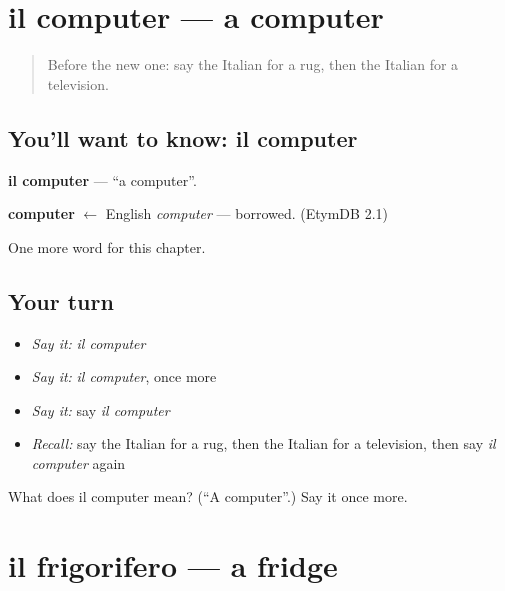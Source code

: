 \section[il computer]{il computer — a computer}

\label{lesson:IT-C94-computer}



\begin{quote}
Before the new one: say the Italian for a rug, then the Italian for a television.
\end{quote}

\subsection*{You'll want to know: il computer}
\textbf{il computer} — \textquotedblleft{}a computer\textquotedblright{}.

\begin{cousinweb}
\textbf{computer} $\leftarrow$ English \emph{computer} — borrowed. (EtymDB 2.1)
\end{cousinweb}

\begin{grammarlens}[title={What you've built}]
One more word for this chapter.
\end{grammarlens}

\subsection*{Your turn}
\begin{itemize}
\raggedright
  \item \emph{Say it:} \emph{il computer}
  \item \emph{Say it:} \emph{il computer}, once more
  \item \emph{Say it:} say \emph{il computer}
  \item \emph{Recall:} say the Italian for a rug, then the Italian for a television, then say \emph{il computer} again
\end{itemize}

\begin{tcolorbox}[breakable,colback=teal!4,colframe=teal!35!black,title={Before you move on}]
What does il computer mean? (\textquotedblleft{}A computer\textquotedblright{}.) Say it once more.
\end{tcolorbox}
\section[il frigorifero]{il frigorifero — a fridge}

